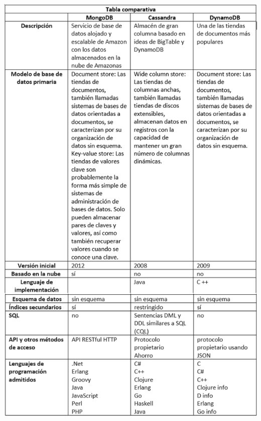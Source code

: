\documentclass[twoside,onecolumn]{article}
\begin{document}
\begin{flushright}
\begin{itemize}
\includegraphics[scale=0.7]{Imagenes/tabla1.png}
\textbf{}\\

\end{itemize}
\end{flushright}
\end{document}
